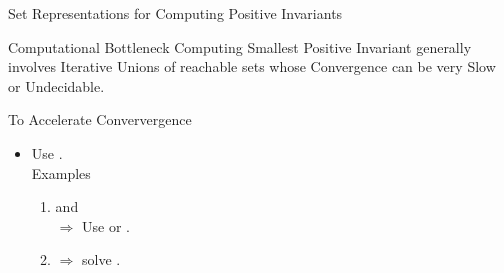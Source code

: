 \begin{frame}{Set Representations for Computing Positive Invariants}
\begin{alertblock}{Computational Bottleneck}
Computing Smallest {\color{red} Positive Invariant} generally
involves { \color{red} Iterative Unions} of reachable sets whose
{\color{red}Convergence can be very Slow} or {\color{red} Undecidable}.\pause
\end{alertblock}
\begin{block}{To Accelerate Conververgence}
\begin{itemize}
\item Use .\\
{\color{brown} Examples}
\begin{enumerate}
\item {} \cite{CousotHalbwachs78,Gawlitza} and  \cite{DBLP:conf/fm/RouxG14} \\$\Rightarrow$ Use  or .
\item {} $\Rightarrow$ solve .
\end{enumerate}
\end{itemize}
\end{block}
\end{frame}

